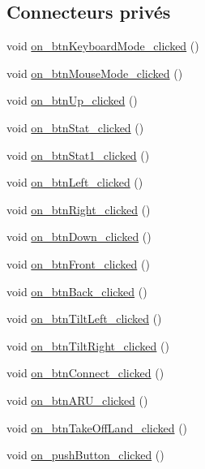\subsection*{Connecteurs privés}
\begin{DoxyCompactItemize}
\item 
void \hyperlink{class_main_window_a669bd2b4bb55b627707cd5766c382ea0}{on\-\_\-btn\-Keyboard\-Mode\-\_\-clicked} ()
\item 
void \hyperlink{class_main_window_a8bc87f10c5091b40201c5e292ad02ff1}{on\-\_\-btn\-Mouse\-Mode\-\_\-clicked} ()
\item 
void \hyperlink{class_main_window_a5220b7d3beb121b3ce2609847d2cb21b}{on\-\_\-btn\-Up\-\_\-clicked} ()
\item 
void \hyperlink{class_main_window_ad0b15e75d6ace91df066500b048c89ca}{on\-\_\-btn\-Stat\-\_\-clicked} ()
\item 
void \hyperlink{class_main_window_a89998d2db841a6c1c4d9d6dc43484cf7}{on\-\_\-btn\-Stat1\-\_\-clicked} ()
\item 
void \hyperlink{class_main_window_ad3a02cdbb3f8fd620b08fe37f3860e9c}{on\-\_\-btn\-Left\-\_\-clicked} ()
\item 
void \hyperlink{class_main_window_adaac593e6d5d1768e5a670269f14a93b}{on\-\_\-btn\-Right\-\_\-clicked} ()
\item 
void \hyperlink{class_main_window_aa8aa8ef959c9595bd766c0392743bd40}{on\-\_\-btn\-Down\-\_\-clicked} ()
\item 
void \hyperlink{class_main_window_a62b7de4e8df5e4cf27d484805f9a0c99}{on\-\_\-btn\-Front\-\_\-clicked} ()
\item 
void \hyperlink{class_main_window_a4b13d79c427350c113c4f48410a029f0}{on\-\_\-btn\-Back\-\_\-clicked} ()
\item 
void \hyperlink{class_main_window_a0a6451b2a2229e065f647304e826c568}{on\-\_\-btn\-Tilt\-Left\-\_\-clicked} ()
\item 
void \hyperlink{class_main_window_af628b3728c2c24cacfd2f91583f8948e}{on\-\_\-btn\-Tilt\-Right\-\_\-clicked} ()
\item 
void \hyperlink{class_main_window_a401a1ce9f9e1997a045bf6a935c9065e}{on\-\_\-btn\-Connect\-\_\-clicked} ()
\item 
void \hyperlink{class_main_window_aabdcb1f13a0dcf682e6dcf4c9b3779b8}{on\-\_\-btn\-A\-R\-U\-\_\-clicked} ()
\item 
void \hyperlink{class_main_window_acd4f5cba500696e45b76a309361f905e}{on\-\_\-btn\-Take\-Off\-Land\-\_\-clicked} ()
\item 
void \hyperlink{class_main_window_a4de79c63c7fa0b8d7c468ac71f20be81}{on\-\_\-push\-Button\-\_\-clicked} ()
\end{DoxyCompactItemize}
